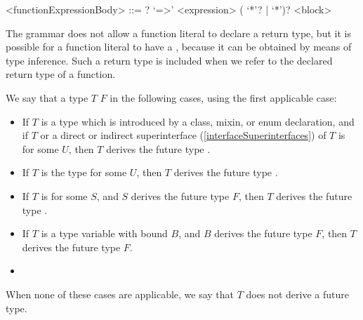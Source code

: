 \documentclass[makeidx]{article}
\begin{document}
{\begin{grammar}
<functionExpressionBody> ::= \ASYNC? `=>' <expression>
  \alt (\ASYNC{} `*'? | \SYNC{} `*')? <block>
\end{grammar}

\LMHash{}%
The grammar does not allow a function literal to declare a return type,
but it is possible for a function literal to have a
,
because it can be obtained by means of type inference.
Such a return type is included
when we refer to the declared return type of a function.


\LMHash{}%
We say that a type $T$
$F$ in the following cases, using the first applicable case:

\begin{itemize}
\item
  If $T$ is a type which is introduced by
  a class, mixin, or enum declaration,
  and if $T$ or a direct or indirect superinterface
  (\ref{interfaceSuperinterfaces})
  of $T$ is  for some $U$,
  then $T$ derives the future type .
\item
  If $T$ is the type  for some $U$,
  then $T$ derives the future type .
\item
  If $T$ is  for some $S$, and
  $S$ derives the future type $F$,
  then $T$ derives the future type .
\item
  If $T$ is a type variable with bound $B$, and
  $B$ derives the future type $F$,
  then $T$ derives the future type $F$.
\item
\end{itemize}

\LMHash{}%
When none of these cases are applicable,
we say that $T$ does not derive a future type.

}
\end{document}
